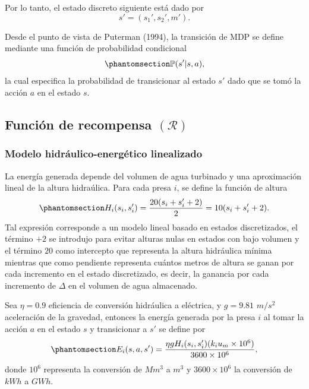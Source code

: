 \documentclass[
  letterpaper,
  DIV=11,
  numbers=noendperiod]{scrreprt}
\theoremstyle{definition}
\theoremstyle{remark}
\begin{document}
Por lo tanto, el estado discreto siguiente está dado por
\[s' = (s_1', s_2', m').\]

Desde el punto de vista de Puterman (1994), la transición de MDP se
define mediante una función de probabilidad condicional
\begin{equation}\protect\phantomsection\label{eq-transicion}{\mathbb{P}(s'|s,a),}\end{equation}
la cual especifica la probabilidad de transicionar al estado \(s'\) dado
que se tomó la acción \(a\) en el estado \(s\).

\subsection{\texorpdfstring{Función de recompensa
\((\mathcal{R})\)}{Función de recompensa (\textbackslash mathcal\{R\})}}\label{funciuxf3n-de-recompensa-mathcalr}

\subsubsection{Modelo hidráulico-energético
linealizado}\label{modelo-hidruxe1ulico-energuxe9tico-linealizado}

La energía generada depende del volumen de agua turbinado y una
aproximación lineal de la altura hidraúlica. Para cada presa \(i\), se
define la función de altura
\begin{equation}\protect\phantomsection\label{eq-altura}{H_i (s_i,s'_i) =\frac{20(s_i + s_i'+2)}{2} =10 (s_i + s_i'+2).}\end{equation}
Tal expresión corresponde a un modelo lineal basado en estados
discretizados, el término \(+2\) se introdujo para evitar alturas nulas
en estados con bajo volumen y el término \(20\) como intercepto que
representa la altura hidráulica mínima mientras que como pendiente
representa cuántos metros de altura se ganan por cada incremento en el
estado discretizado, es decir, la ganancia por cada incremento de
\(\Delta\) en el volumen de agua almacenado.

Sea \(\eta = 0.9\) eficiencia de conversión hidráulica a eléctrica, y
\(g = 9.81\) \(m/s^2\) aceleración de la gravedad, entonces la energía
generada por la presa \(i\) al tomar la acción \(a\) en el estado \(s\)
y transicionar a \(s'\) se define por
\begin{equation}\protect\phantomsection\label{eq-energia}{E_i(s,a,s') = \frac{\eta g  H_i(s_i,s'_i) (k_iu_m\times 10^6)}{3600\times 10^6},}\end{equation}
donde \(10^6\) representa la conversión de \(Mm^3\) a \(m^3\) y
\(3600\times 10^6\) la conversión de \(kWh\) a \(GWh\).
\end{document}
